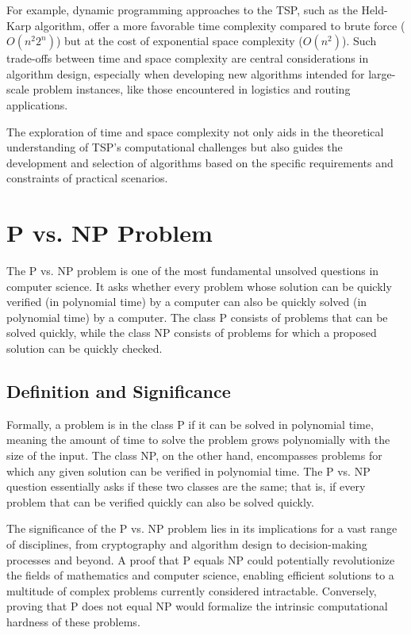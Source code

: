 For example, dynamic programming approaches to the TSP, such as the Held-Karp algorithm, offer a more favorable time complexity compared to brute force (\(O(n^2 2^n)\)) but at the cost of exponential space complexity (\(O(n^2)\)). Such trade-offs between time and space complexity are central considerations in algorithm design, especially when developing new algorithms intended for large-scale problem instances, like those encountered in logistics and routing applications.

The exploration of time and space complexity not only aids in the theoretical understanding of TSP's computational challenges but also guides the development and selection of algorithms based on the specific requirements and constraints of practical scenarios.


\section{P vs. NP Problem}

The P vs. NP problem is one of the most fundamental unsolved questions in computer science. It asks whether every problem whose solution can be quickly verified (in polynomial time) by a computer can also be quickly solved (in polynomial time) by a computer. The class P consists of problems that can be solved quickly, while the class NP consists of problems for which a proposed solution can be quickly checked.

\subsection{Definition and Significance}

Formally, a problem is in the class P if it can be solved in polynomial time, meaning the amount of time to solve the problem grows polynomially with the size of the input. The class NP, on the other hand, encompasses problems for which any given solution can be verified in polynomial time. The P vs. NP question essentially asks if these two classes are the same; that is, if every problem that can be verified quickly can also be solved quickly.

The significance of the P vs. NP problem lies in its implications for a vast range of disciplines, from cryptography and algorithm design to decision-making processes and beyond. A proof that P equals NP could potentially revolutionize the fields of mathematics and computer science, enabling efficient solutions to a multitude of complex problems currently considered intractable. Conversely, proving that P does not equal NP would formalize the intrinsic computational hardness of these problems.

